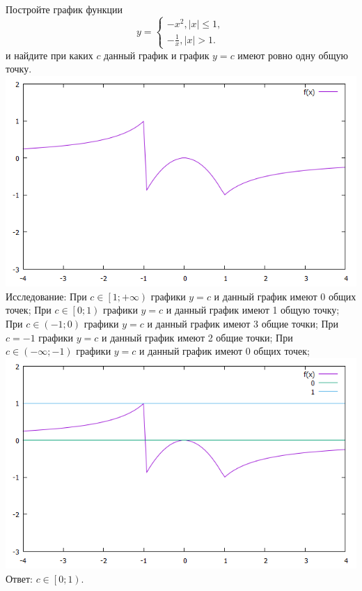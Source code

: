 \documentclass{article}
\begin{document}
	Постройте график функции\newline
	$$
		y =
		\begin{cases}
			-x^2, |x| \leq 1, \\
			-\frac{1}{x}, |x| > 1.
		\end{cases}
	$$
	\newline и найдите при каких $c$ данный график и график $ y = c $ имеют
	ровно одну общую точку.
	\newline\includegraphics[scale=0.4]{kostya_1.png} \newline
	Исследование:
	\newline\space При $c \in \left[ 1; +\infty \right)$ графики 
	$ y = c $ и данный график имеют 0 общих точек;
	\newline\space При $c \in \left[ 0; 1 \right)$ графики $ y = c $
	и данный график имеют 1 общую точку;
	\newline\space При $c \in \left( -1; 0 \right)$ графики $ y = c $
	и данный график имеют 3 общие точки;
	\newline\space При $c = -1$ графики $ y = c $
	и данный график имеют 2 общие точки;
	\newline\space При $c \in \left( -\infty; -1 \right)$ графики 
	$ y = c $ и данный график имеют 0 общих точек;
	\newline\includegraphics[scale=0.4]{kostya_2.png}
	\newline Ответ: $ c \in \left[ 0; 1 \right) $.
	
\end{document}

